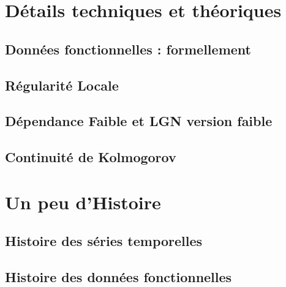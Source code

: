 \chapter{Détails techniques et théoriques}


\section{Données fonctionnelles : formellement}
\label{annexe:fda-formel}

\pagebreak


\section{Régularité Locale}
\label{annexe:regularite-locale}

\pagebreak


\section{Dépendance Faible et LGN version faible}
\label{annexe:weak_dep}





\pagebreak

\section{Continuité de Kolmogorov}
\label{annexe:continuite_kolmogorov}


\chapter{Un peu d'Histoire}
\label{annexe:histoire}
\section{ Histoire des séries temporelles }

\pagebreak
\section{ Histoire des données fonctionnelles }

\pagebreak


